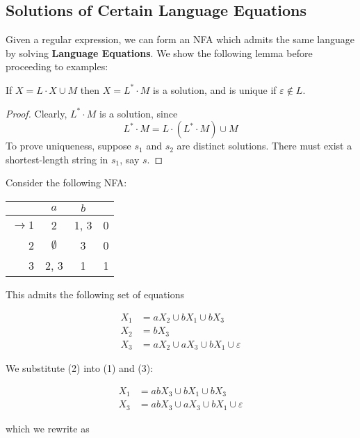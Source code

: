 \subsection{Solutions of Certain Language Equations}\label{subsubsec:solutions-of-certain-language-equations}

Given a regular expression, we can form an NFA which admits the same language by solving \textbf{Language Equations}. We show the following lemma before proceeding to examples:

\begin{lemma}
      If \(X=L\cdot X\cup M\) then \(X=L^*\cdot M\) is a solution, and is unique if \(\varepsilon\not\in L\). 
\end{lemma}

\begin{proof}
      Clearly, \(L^*\cdot M\) is a solution, since \[L^*\cdot M = L\cdot (L^*\cdot M)\cup M\] To prove uniqueness, suppose \(s_1\) and \(s_2\) are distinct solutions. There must exist a shortest-length string in \(s_1\), say \(s\). 
\end{proof}

Consider the following NFA\@:

\begin{center}\begin{tabular}{r c c r}
      & \(a\) & \(b\) & \\\bottomrule
      \(\to 1\) & 2 & 1, 3 & 0\\
            2 & \(\emptyset \) & 3 & 0\\
            3 & 2, 3 & 1 & 1
 \end{tabular}\end{center}

This admits the following set of equations 

\begin{align}
      X_1 &= aX_2\cup bX_1\cup bX_3\\
      X_2 &= bX_3\\
      X_3 &= aX_2\cup aX_3\cup bX_1\cup\varepsilon
\end{align}

We substitute (2) into (1) and (3):

\begin{align*}
      X_1 &= abX_3\cup bX_1\cup bX_3\\
      X_3 &= abX_3\cup aX_3\cup bX_1\cup\varepsilon
\end{align*}

which we rewrite as

